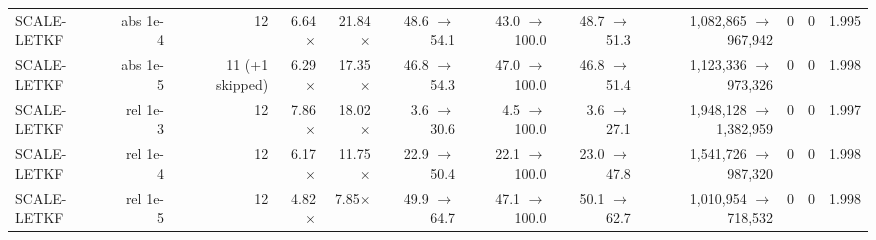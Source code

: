 \begin{tabular}{lrrrrrrrrrrr}
SCALE-LETKF & abs 1e-4 & 12 & 6.64$\times$ & 21.84$\times$ & 48.6 $\to$ 54.1 & 43.0 $\to$ 100.0 & 48.7 $\to$ 51.3 & 1,082,865 $\to$ 967,942 & 0 & 0 & 1.995 \\
SCALE-LETKF & abs 1e-5 & 11 (+1 skipped) & 6.29$\times$ & 17.35$\times$ & 46.8 $\to$ 54.3 & 47.0 $\to$ 100.0 & 46.8 $\to$ 51.4 & 1,123,336 $\to$ 973,326 & 0 & 0 & 1.998 \\
SCALE-LETKF & rel 1e-3 & 12 & 7.86$\times$ & 18.02$\times$ & 3.6 $\to$ 30.6 & 4.5 $\to$ 100.0 & 3.6 $\to$ 27.1 & 1,948,128 $\to$ 1,382,959 & 0 & 0 & 1.997 \\
SCALE-LETKF & rel 1e-4 & 12 & 6.17$\times$ & 11.75$\times$ & 22.9 $\to$ 50.4 & 22.1 $\to$ 100.0 & 23.0 $\to$ 47.8 & 1,541,726 $\to$ 987,320 & 0 & 0 & 1.998 \\
SCALE-LETKF & rel 1e-5 & 12 & 4.82$\times$ & 7.85$\times$ & 49.9 $\to$ 64.7 & 47.1 $\to$ 100.0 & 50.1 $\to$ 62.7 & 1,010,954 $\to$ 718,532 & 0 & 0 & 1.998 \\
\bottomrule
\end{tabular}

